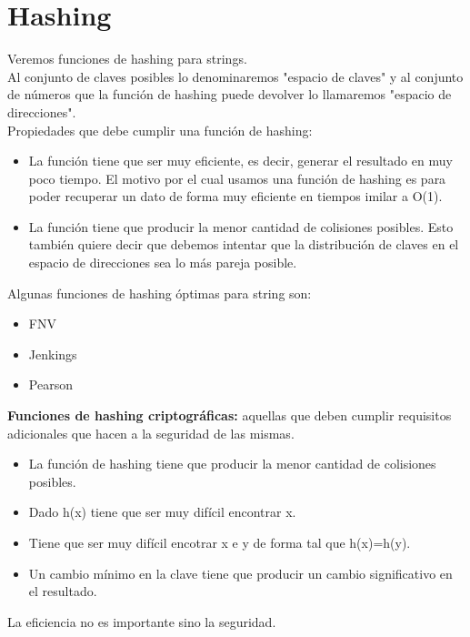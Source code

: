 \documentclass[titlepage,a4paper]{article}
\begin{document}
\section*{Hashing}

Veremos funciones de hashing para strings. \\

Al conjunto de claves posibles lo denominaremos "espacio de claves" y al conjunto de números que la función de hashing puede devolver lo llamaremos "espacio de direcciones". \\

Propiedades que debe cumplir una función de hashing: \\
\begin{itemize}
\item La función tiene que ser muy eficiente, es decir, generar el resultado en muy poco tiempo. El motivo por el cual usamos una función de hashing es para poder recuperar un dato de forma muy eficiente en tiempos imilar a O(1). 
\item La función tiene que producir la menor cantidad de colisiones posibles. Esto también quiere decir que debemos intentar que la distribución de claves en el espacio de direcciones sea lo más pareja posible.  
\end{itemize}

Algunas funciones de hashing óptimas para string son: 
\begin{itemize}
\item FNV
\item Jenkings
\item Pearson
\end{itemize}

\textbf{Funciones de hashing criptográficas:} aquellas que deben cumplir requisitos adicionales que hacen a la seguridad de las mismas. \\
\begin{itemize}
\item La función de hashing tiene que producir la menor cantidad de colisiones posibles. 
\item Dado h(x) tiene que ser muy difícil encontrar x. 
\item Tiene que ser muy difícil encotrar x e y de forma tal que h(x)=h(y). 
\item Un cambio mínimo en la clave tiene que producir un cambio significativo en el resultado. 
\end{itemize}

La eficiencia no es importante sino la seguridad. \\
\end{document}
